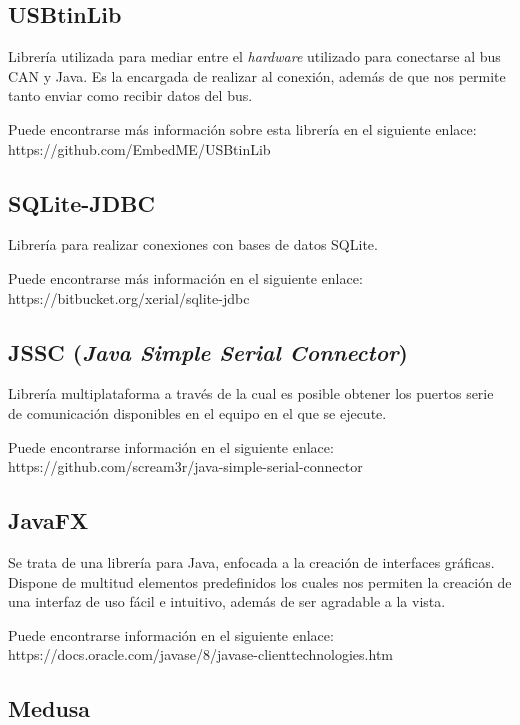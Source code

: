 \subsection{USBtinLib}\label{usbtinlib}

Librería utilizada para mediar entre el \emph{hardware} utilizado para conectarse al bus CAN y Java. Es la encargada de realizar al conexión, además de que nos permite tanto enviar como recibir datos del bus. 

Puede encontrarse más información sobre esta librería en el siguiente enlace: https://github.com/EmbedME/USBtinLib

\subsection{SQLite-JDBC}\label{sqlite-jdbc}

Librería para realizar conexiones con bases de datos SQLite.

Puede encontrarse más información en el siguiente enlace: https://bitbucket.org/xerial/sqlite-jdbc

\subsection{JSSC (\emph{Java Simple Serial Connector})}\label{jssc_java_simple_serial_connector}

Librería multiplataforma a través de la cual es posible obtener los puertos serie de comunicación disponibles en el equipo en el que se ejecute.

Puede encontrarse información en el siguiente enlace: https://github.com/scream3r/java-simple-serial-connector


\subsection{JavaFX}\label{javafx}
Se trata de una librería para Java, enfocada a la creación de interfaces gráficas. Dispone de multitud elementos predefinidos los cuales nos permiten la creación de una interfaz de uso fácil e intuitivo, además de ser agradable a la vista.

Puede encontrarse información en el siguiente enlace: https://docs.oracle.com/javase/8/javase-clienttechnologies.htm

\subsection{Medusa}\label{medusa}

